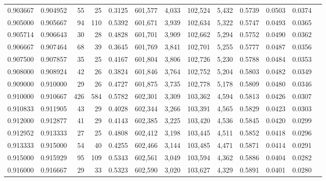 \begin{tabular}{rrrrrrrrrrrrr}
0.903667 & 0.904952 &    55 &  25 &                                     0.3125 & 601,577 &   4,033 & 102,524 &   5,432 & 0.5739 & 0.0503 & 0.0374 \\
0.905000 & 0.905667 &    94 & 110 &                                     0.5392 & 601,671 &   3,939 & 102,634 &   5,322 & 0.5747 & 0.0493 & 0.0365 \\
0.905714 & 0.906643 &    30 &  28 &                                     0.4828 & 601,701 &   3,909 & 102,662 &   5,294 & 0.5752 & 0.0490 & 0.0362 \\
0.906667 & 0.907464 &    68 &  39 &                                     0.3645 & 601,769 &   3,841 & 102,701 &   5,255 & 0.5777 & 0.0487 & 0.0356 \\
0.907500 & 0.907857 &    35 &  25 &                                     0.4167 & 601,804 &   3,806 & 102,726 &   5,230 & 0.5788 & 0.0484 & 0.0353 \\
0.908000 & 0.908924 &    42 &  26 &                                     0.3824 & 601,846 &   3,764 & 102,752 &   5,204 & 0.5803 & 0.0482 & 0.0349 \\
0.909000 & 0.910000 &    29 &  26 &                                     0.4727 & 601,875 &   3,735 & 102,778 &   5,178 & 0.5809 & 0.0480 & 0.0346 \\
0.910000 & 0.910667 &   426 & 584 &                                     0.5782 & 602,301 &   3,309 & 103,362 &   4,594 & 0.5813 & 0.0426 & 0.0307 \\
0.910833 & 0.911905 &    43 &  29 &                                     0.4028 & 602,344 &   3,266 & 103,391 &   4,565 & 0.5829 & 0.0423 & 0.0303 \\
0.912000 & 0.912877 &    41 &  29 &                                     0.4143 & 602,385 &   3,225 & 103,420 &   4,536 & 0.5845 & 0.0420 & 0.0299 \\
0.912952 & 0.913333 &    27 &  25 &                                     0.4808 & 602,412 &   3,198 & 103,445 &   4,511 & 0.5852 & 0.0418 & 0.0296 \\
0.913333 & 0.915000 &    54 &  40 &                                     0.4255 & 602,466 &   3,144 & 103,485 &   4,471 & 0.5871 & 0.0414 & 0.0291 \\
0.915000 & 0.915929 &    95 & 109 &                                     0.5343 & 602,561 &   3,049 & 103,594 &   4,362 & 0.5886 & 0.0404 & 0.0282 \\
0.916000 & 0.916667 &    29 &  33 &                                     0.5323 & 602,590 &   3,020 & 103,627 &   4,329 & 0.5891 & 0.0401 & 0.0280 \\

\end{tabular}

